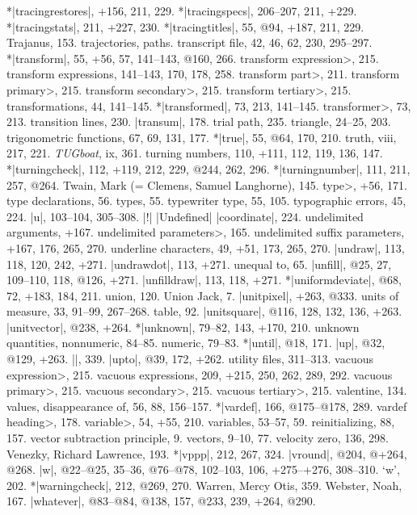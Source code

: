 *|tracingrestores|, +156, 211, 229.
*|tracingspecs|, 206--207, 211, +229.
*|tracingstats|, 211, +227, 230.
*|tracingtitles|, 55, @94, +187, 211, 229.
Trajanus, 153.
trajectories, \see paths.
transcript file, 42, 46, 62, 230, 295--297.
*|transform|, 55, +56, 57, 141--143, @160, 266.
\<transform expression>, 215.
transform expressions, 141--143, 170, 178, 258.
\<transform part>, 211.
\<transform primary>, 215.
\<transform secondary>, 215.
\<transform tertiary>, 215.
transformations, 44, 141--145.
*|transformed|, 73, 213, 141--145.
\<transformer>, 73, 213.
transition lines, 230.
|transum|, 178.
trial path, 235.
triangle, 24--25, 203.
trigonometric functions, 67, 69, 131, 177.
*|true|, 55, @64, 170, 210.
truth, viii, 217, 221.
{\sl TUGboat}, ix, 361.
turning numbers, 110, +111, 112, 119, 136, 147.
*|turningcheck|, 112, +119, 212, 229, @244, 262, 296.
*|turningnumber|, 111, 211, 257, @264.
Twain, Mark (= Clemens, Samuel Langhorne), 145.
\<type>, +56, 171.
type declarations, 56.
types, 55.
typewriter type, 55, 105.
typographic errors, 45, 224.
\newletter
|u|, 103--104, 305--308.
|!| |Undefined| |coordinate|, 224.
undelimited arguments, +167.
\<undelimited parameters>, 165.
undelimited suffix parameters, +167, 176, 265, 270.
underline characters, 49, +51, 173, 265, 270.
|undraw|, 113, 118, 120, 242, +271.
|undrawdot|, 113, +271.
unequal to, 65.
|unfill|, @25, 27, 109--110, 118, @126, +271.
|unfilldraw|, 113, 118, +271.
*|uniformdeviate|, @68, 72, +183, 184, 211.
union, 120.
Union Jack, 7.
|unitpixel|, +263, @333.
units of measure, 33, 91--99, 267--268.
\sub table, 92.
|unitsquare|, @116, 128, 132, 136, +263.
|unitvector|, @238, +264.
*|unknown|, 79--82, 143, +170, 210.
unknown quantities, nonnumeric, 84--85.
\sub numeric, 79--83.
*|until|, @18, 171.
|up|, @32, @129, +263.
|\uppers|, 339.
|upto|, @39, 172, +262.
utility files, 311--313.
\newletter
\<vacuous expression>, 215.
vacuous expressions, 209, +215, 250, 262, 289, 292.
\<vacuous primary>, 215.
\<vacuous secondary>, 215.
\<vacuous tertiary>, 215.
valentine, 134.
values, disappearance of, 56, 88, 156--157.
*|vardef|, 166, @175--@178, 289.
\<vardef heading>, 178.
\<variable>, 54, +55, 210.
variables, 53--57, 59.
\sub reinitializing, 88, 157.
vector subtraction principle, 9.
vectors, 9--10, 77.
velocity zero, 136, 298.
Venezky, Richard Lawrence, 193.
*|vppp|, 212, 267, 324.
|vround|, @204, @+264, @268.
\newletter
|w|, @22--@25, 35--36, @76--@78, 102--103, 106, +275--+276, 308--310.
`w', 202.
*|warningcheck|, 212, @269, 270.
Warren, Mercy Otis, 359.
Webster, Noah, 167.
|whatever|, @83--@84, @138, 157, @233, 239, +264, @290.
